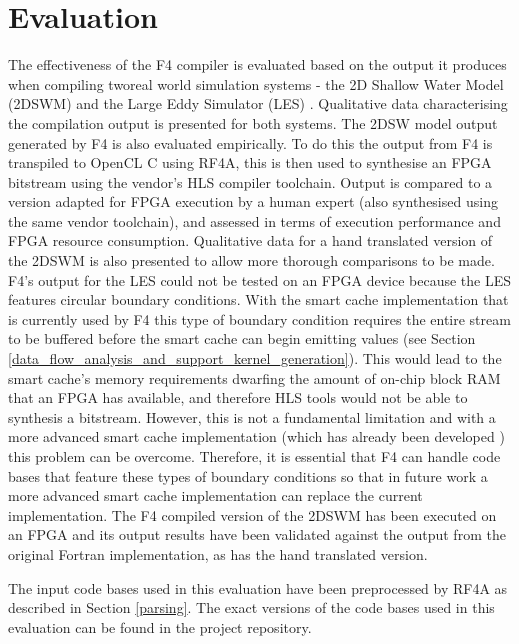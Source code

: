 \documentclass{mpaper}
\begin{document}
\section{Evaluation}

The effectiveness of the F4 compiler is evaluated based on the output it produces when compiling tworeal world simulation systems - the 2D Shallow Water Model (2DSWM) \cite{Hall2009} and the Large Eddy Simulator (LES) \cite{Nakayama2011}.
Qualitative data characterising the compilation output is presented for both systems. 
The 2DSW model output generated by F4 is also evaluated empirically.
To do this the output from F4 is transpiled to OpenCL C using RF4A, this is then used to synthesise an FPGA bitstream using the vendor's HLS compiler toolchain. 
Output is compared to a version adapted for FPGA execution by a human expert (also synthesised using the same vendor toolchain), and assessed in terms of execution performance and FPGA resource consumption. 
Qualitative data for a hand translated version of the 2DSWM is also presented to allow more thorough comparisons to be made.
F4's output for the LES could not be tested on an FPGA device because the LES features circular boundary conditions. 
With the smart cache implementation that is currently used by F4 this type of boundary condition requires the entire stream to be buffered before the smart cache can begin emitting values (see Section \ref{data_flow_analysis_and_support_kernel_generation}).
This would lead to the smart cache's memory requirements dwarfing the amount of on-chip block RAM that an FPGA has available, and therefore HLS tools would not be able to synthesis a bitstream. 
However, this is not a fundamental limitation and with a more advanced smart cache implementation (which has already been developed \cite{Nabi2019}) this problem can be overcome.
Therefore, it is essential that F4 can handle code bases that feature these types of boundary conditions so that in future work a more advanced smart cache implementation can replace the current implementation. 
The F4 compiled version of the 2DSWM has been executed on an FPGA and its output results have been validated against the output from the original Fortran implementation, as has the hand translated version.

The input code bases used in this evaluation have been preprocessed by RF4A as described in Section \ref{parsing}.
The exact versions of the code bases used in this evaluation can be found in the project repository. 
\end{document}
